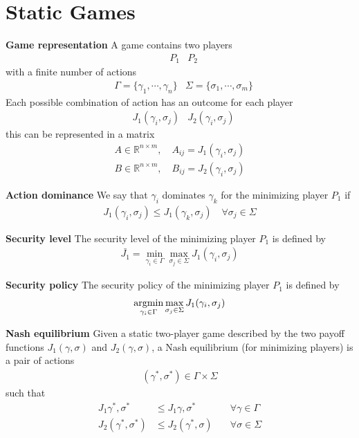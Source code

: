 \section{Static Games}


\textbf{Game representation} \newline
A game contains two players
\begin{align*}
    & P_1 & P_2
\end{align*}
with a finite number of actions
\begin{align*}
    &\Gamma = \{\gamma_1, \cdots , \gamma_n\} & 
    \Sigma = \{\sigma_1, \cdots , \sigma_m\}
\end{align*}
Each possible combination of action has an outcome
for each player
\begin{align*}
    & J_1(\gamma_i, \sigma_j) & J_2(\gamma_i, \sigma_j)
\end{align*}
this can be represented in a matrix
\begin{align*}
    A \in \mathbb{R}^{n \times m}, \quad A_{ij} = J_1(\gamma_i, \sigma_j) \\
    B \in \mathbb{R}^{n \times m}, \quad B_{ij} = J_2(\gamma_i, \sigma_j)
\end{align*}


\textbf{Action dominance} \newline
We say that $\gamma_i$ dominates $\gamma_k$ for the minimizing player $P_1$ if
\begin{align*}
    J_1(\gamma_i, \sigma_j) \leq J_1(\gamma_k, \sigma_j) \quad \forall \sigma_j \in \Sigma
\end{align*}


\textbf{Security level} \newline
The security level of the minimizing player $P_1$ is defined by
\begin{align*}
    \bar{J_1} = \min_{\gamma_i \in \Gamma} \max_{\sigma_j \in \Sigma} J_1(\gamma_i, \sigma_j)
\end{align*}


\textbf{Security policy} \newline
The security policy of the minimizing player $P_1$ is defined by
\begin{align*}
    \operatorname*{argmin}_{\gamma_i \in \Gamma} \max_{\sigma_j \in \Sigma} J_1(\gamma_i, \sigma_j)
\end{align*}


\textbf{Nash equilibrium} \newline
Given a static two-player game described by the two payoff functions
$J_1(\gamma,\sigma)$ and $J_2(\gamma,\sigma)$, a Nash equilibrium (for minimizing
players) is a pair of actions
\begin{align*}
    (\gamma^*, \sigma^*) \in \Gamma\times\Sigma
\end{align*}
such that
\begin{align*}
    J_1{\gamma^*, \sigma^*} &\leq J_1{\gamma, \sigma^*} \quad &\forall \gamma \in \Gamma \\
    J_2(\gamma^*, \sigma^*) &\leq J_2(\gamma^*, \sigma) \quad &\forall \sigma \in \Sigma
\end{align*}


